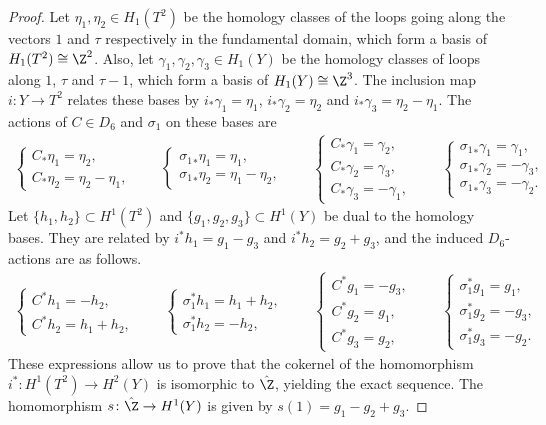 \begin{proof}
Let $\eta_1, \eta_2 \in H_1(T^2)$ be the homology classes of the loops going along the vectors $1$ and $\tau$ respectively in the fundamental domain, which form a basis of $H_1(T^2) \cong \Z^2$. Also, let $\gamma_1, \gamma_2, \gamma_3 \in H_1(Y)$ be the homology classes of loops along $1$, $\tau$ and $\tau - 1$, which form a basis of $H_1(Y) \cong \Z^3$. The inclusion map $i\colon Y \to T^2$ relates these bases by $i_*\gamma_1 = \eta_1$, $i_*\gamma_2 = \eta_2$ and $i_*\gamma_3 = \eta_2 - \eta_1$. The actions of $C \in D_6$ and $\sigma_1$ on these bases are
\begin{gather*}
\begin{cases}
C_*\eta_1 = \eta_2, \\
C_*\eta_2 = \eta_2 - \eta_1,
\end{cases}
\qquad
\begin{cases}
{\sigma_1}_*\eta_1 = \eta_1, \\
{\sigma_1}_*\eta_2 = \eta_1 - \eta_2,
\end{cases}
\qquad
\begin{cases}
C_*\gamma_1 = \gamma_2, \\
C_*\gamma_2 = \gamma_3, \\
C_*\gamma_3 = - \gamma_1,
\end{cases}
\qquad
\begin{cases}
{\sigma_1}_*\gamma_1 = \gamma_1, \\
{\sigma_1}_*\gamma_2 = - \gamma_3, \\
{\sigma_1}_*\gamma_3 = - \gamma_2.
\end{cases}\!\!\!
\end{gather*}
Let $\{ h_1, h_2 \} \subset H^1(T^2)$ and $\{ g_1, g_2, g_3 \} \subset H^1(Y)$ be dual to the homology bases. They are related by $i^*h_1 = g_1 - g_3$ and $i^*h_2 = g_2 + g_3$, and the induced $D_6$-actions are as follows.
\begin{gather*}
\begin{cases}
C^*h_1 = - h_2, \\
C^*h_2 = h_1 + h_2,
\end{cases}\qquad
\begin{cases}
\sigma_1^*h_1 = h_1 + h_2, \\
\sigma_1^*h_2 = - h_2,
\end{cases}\qquad
\begin{cases}
C^*g_1 = - g_3, \\
C^*g_2 = g_1, \\
C^*g_3 = g_2,
\end{cases}\qquad
\begin{cases}
\sigma_1^*g_1 = g_1, \\
\sigma_1^*g_2 = - g_3, \\
\sigma_1^*g_3 = - g_2.
\end{cases}
\end{gather*}
These expressions allow us to prove that the cokernel of the homomorphism $i^* \colon H^1(T^2) \to H^2(Y)$ is isomorphic to $\hat{\Z}$, yielding the exact sequence. The homomorphism $s\colon \hat{\Z} \to H^1(Y)$ is given by $s(1) = g_1 - g_2 + g_3$.
\end{proof}

